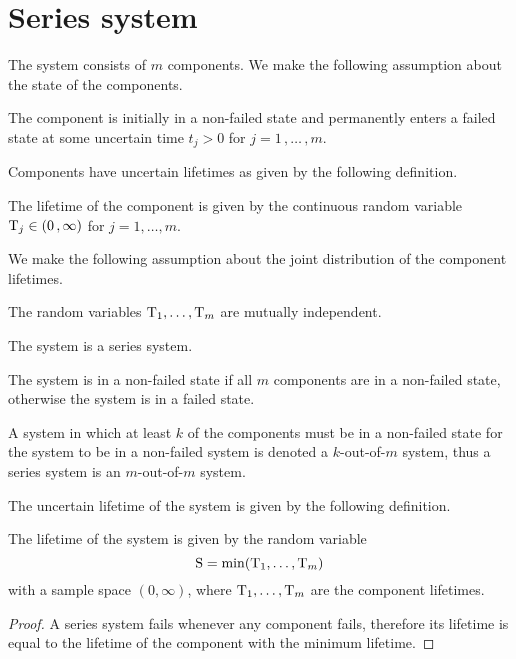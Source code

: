 \documentclass[../main.tex]{subfiles}
\begin{document}
\section{Series system}
The system consists of $m$ components. We make the following assumption about 
the state of the components.
\begin{assumption}
\label{asm:binary_state}
The \jth component is initially in a non-failed state and permanently enters a failed state at some uncertain time $t_j > 0$ for $j=1\,,\ldots\,,m$.
\end{assumption}
Components have uncertain lifetimes as given by the following definition.
\begin{definition}
The lifetime of the \jth component is given by the continuous random variable 
$\mathrm{T}_j \in \left(0\,,\infty\right)$ for $j=1,\ldots,m$.
\end{definition}
We make the following assumption about the joint distribution of the component lifetimes.
\begin{assumption}
\label{asm:indep}
The random variables $\mathrm{T}_1,\ldots,\mathrm{T}_m$ are mutually independent.
\end{assumption}

The system is a series system.
\begin{assumption}
    The system is in a non-failed state if all $m$ components are in a non-failed state, otherwise the system is in a failed state.
\end{assumption}
A system in which at least $k$ of the components must be in a non-failed state for the system to be in a non-failed system is denoted a $k$-out-of-$m$ system, 
thus a series system is an $m$-out-of-$m$ system.

The uncertain lifetime of the system is given by the following definition.
\begin{theorem}
    \label{thm:series_system_lifetime}
    The lifetime of the system is given by the random variable
    \begin{equation}
    \label{eq:series_system_lifetime}
    \mathrm{S} = \min{\!\left(\mathrm{T}_1,\ldots,\mathrm{T}_m\right)}
    \end{equation}
    with a sample space $\left(0, \infty\right)$, where $\mathrm{T}_1,\ldots,\mathrm{T}_m$ are the component lifetimes.
\end{theorem}
\begin{proof}
    A series system fails whenever any component fails, therefore its lifetime is equal to the lifetime of the component with the minimum lifetime.
\end{proof}
\end{document}
